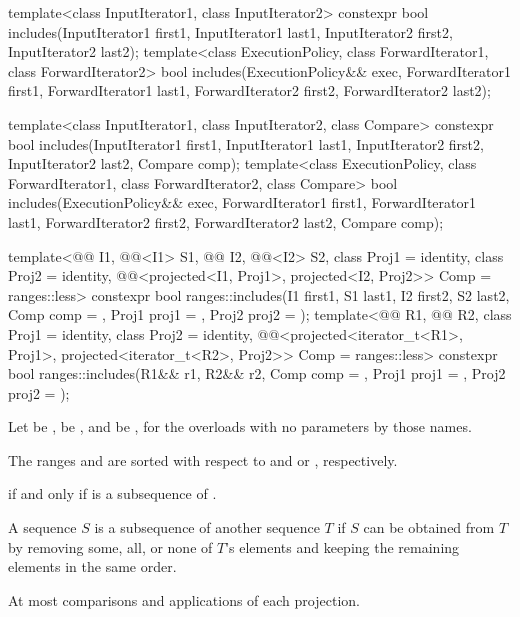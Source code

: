 %
\begin{itemdecl}
template<class InputIterator1, class InputIterator2>
  constexpr bool includes(InputIterator1 first1, InputIterator1 last1,
                          InputIterator2 first2, InputIterator2 last2);
template<class ExecutionPolicy, class ForwardIterator1, class ForwardIterator2>
  bool includes(ExecutionPolicy&& exec,
                ForwardIterator1 first1, ForwardIterator1 last1,
                ForwardIterator2 first2, ForwardIterator2 last2);

template<class InputIterator1, class InputIterator2, class Compare>
  constexpr bool includes(InputIterator1 first1, InputIterator1 last1,
                          InputIterator2 first2, InputIterator2 last2,
                          Compare comp);
template<class ExecutionPolicy, class ForwardIterator1, class ForwardIterator2, class Compare>
  bool includes(ExecutionPolicy&& exec,
                ForwardIterator1 first1, ForwardIterator1 last1,
                ForwardIterator2 first2, ForwardIterator2 last2,
                Compare comp);

template<@@ I1, @@<I1> S1, @@ I2, @@<I2> S2,
         class Proj1 = identity, class Proj2 = identity,
         @@<projected<I1, Proj1>,
                                    projected<I2, Proj2>> Comp = ranges::less>
  constexpr bool ranges::includes(I1 first1, S1 last1, I2 first2, S2 last2, Comp comp = {},
                                  Proj1 proj1 = {}, Proj2 proj2 = {});
template<@@ R1, @@ R2, class Proj1 = identity,
         class Proj2 = identity,
         @@<projected<iterator_t<R1>, Proj1>,
                                    projected<iterator_t<R2>, Proj2>> Comp = ranges::less>
  constexpr bool ranges::includes(R1&& r1, R2&& r2, Comp comp = {},
                                  Proj1 proj1 = {}, Proj2 proj2 = {});
\end{itemdecl}

\begin{itemdescr}
\pnum
Let  be ,
 be , and
 be ,
for the overloads with no parameters by those names.

\pnum
\expects
The ranges  and  are sorted
with respect to  and  or , respectively.

\pnum
\returns
{}
if and only if  is a subsequence of .
\begin{note}
A sequence $S$ is a subsequence of another sequence $T$ if $S$ can be obtained
from $T$ by removing some, all, or none of $T$'s elements and keeping the
remaining elements in the same order.
\end{note}

\pnum
\complexity
At most 
comparisons and applications of each projection.
\end{itemdescr}

